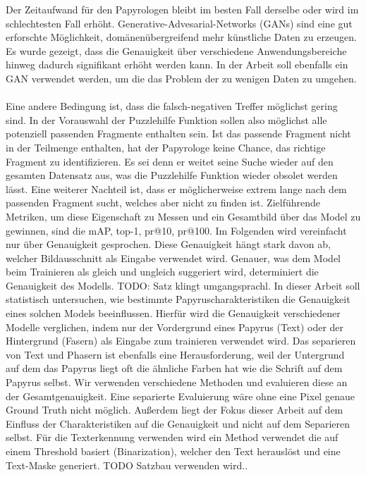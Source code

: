 \documentclass[12pt,a4paper]{article}
\begin{document}
Der Zeitaufwand für den Papyrologen bleibt im besten Fall derselbe oder wird im schlechtesten Fall erhöht. Generative-Advesarial-Networks (GANs) sind eine gut erforschte Möglichkeit, domänenübergreifend mehr künstliche Daten zu erzeugen. %
Es wurde gezeigt, dass die Genauigkeit über verschiedene Anwendungsbereiche hinweg dadurch signifikant erhöht werden kann. In der Arbeit soll ebenfalls ein GAN verwendet werden, um die das Problem der zu wenigen Daten zu umgehen. 
\\\\
Eine andere Bedingung ist, dass die falsch-negativen Treffer möglichst gering sind. %
In der Vorauswahl der Puzzlehilfe Funktion sollen also %
möglichst alle potenziell passenden Fragmente enthalten sein. Ist das passende Fragment nicht in der Teilmenge enthalten, hat der Papyrologe keine Chance, das richtige Fragment zu identifizieren. Es sei denn er weitet seine Suche wieder auf den gesamten Datensatz aus, was %
die Puzzlehilfe Funktion wieder obsolet werden lässt. 
Eine weiterer Nachteil ist, dass er möglicherweise extrem lange nach dem passenden Fragment sucht, welches aber nicht zu finden ist. 
Zielführende Metriken, um diese Eigenschaft zu Messen und ein Gesamtbild über das Model zu gewinnen, sind die mAP, top-1, pr@10, pr@100. %
Im Folgenden wird vereinfacht nur über Genauigkeit gesprochen. Diese Genauigkeit hängt stark davon ab, welcher Bildausschnitt als Eingabe verwendet wird. Genauer, was dem Model beim Trainieren als gleich und ungleich suggeriert wird, determiniert die Genauigkeit des Modells. TODO: Satz klingt umgangsprachl.
In dieser Arbeit soll statistisch untersuchen, %
wie bestimmte Papyruscharakteristiken die Genauigkeit eines solchen Models beeinflussen. Hierfür wird die Genauigkeit verschiedener Modelle verglichen, indem nur der Vordergrund eines Papyrus (Text) oder der Hintergrund (Fasern) als Eingabe zum trainieren verwendet wird. %
Das separieren %
von Text und Phasern ist ebenfalls eine Herausforderung, weil der Untergrund auf dem das Papyrus liegt oft die ähnliche Farben hat wie die Schrift auf dem Papyrus selbst. 
Wir verwenden verschiedene Methoden und evaluieren diese an der Gesamtgenauigkeit. Eine separierte Evaluierung wäre ohne eine Pixel genaue Ground Truth nicht möglich. Außerdem liegt der Fokus dieser Arbeit auf dem Einfluss der Charakteristiken auf die Genauigkeit und nicht auf dem Separieren selbst. Für die Texterkennung verwenden wird ein Method verwendet die auf einem Threshold basiert (Binarization), welcher den Text herauslöst und eine Text-Maske generiert. TODO Satzbau verwenden wird..
\end{document}
